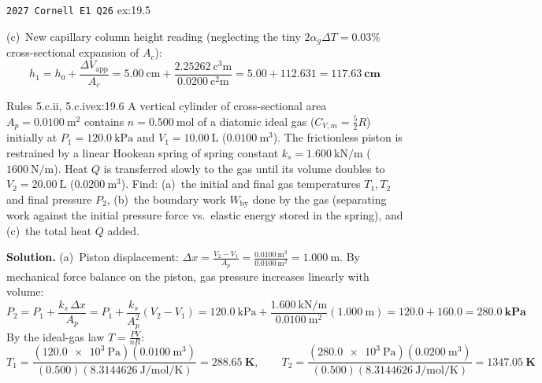 \begin{workedexample}{\texttt{2027 Cornell E1 Q26} }{ex:19.5}
\par\noindent
(c)~New capillary column height reading (neglecting the tiny $2\alpha_g\Delta T = 0.03\%$ cross-sectional expansion of $A_c$):
$$h_1 = h_0 + \frac{\Delta V_{\mathrm{app}}}{A_c} = \SI{5.00}{\centi\meter} + \frac{\SI{2.25262}{\cubic\centi\meter}}{\SI{0.0200}{\square\centi\meter}} = 5.00 + 112.631 = \mathbf{\SI{117.63}{\centi\meter}}$$
\end{workedexample}

\begin{workedexample}{Rules 5.c.ii, 5.c.iv}{ex:19.6}
A vertical cylinder of cross-sectional area $A_p = \SI{0.0100}{\square\meter}$ contains $n = \SI{0.500}{\mole}$ of a diatomic ideal gas ($C_{V,m} = \frac{5}{2}R$) initially at $P_1 = \SI{120.0}{\kilo\pascal}$ and $V_1 = \SI{10.00}{\liter}$ ($\SI{0.0100}{\cubic\meter}$). The frictionless piston is restrained by a linear Hookean spring of spring constant $k_s = \SI{1.600}{\kilo\newton\per\meter}$ ($\SI{1600}{\newton\per\meter}$). Heat $Q$ is transferred slowly to the gas until its volume doubles to $V_2 = \SI{20.00}{\liter}$ ($\SI{0.0200}{\cubic\meter}$). Find: (a)~the initial and final gas temperatures $T_1, T_2$ and final pressure $P_2$, (b)~the boundary work $W_{\mathrm{by}}$ done by the gas (separating work against the initial pressure force vs.\ elastic energy stored in the spring), and (c)~the total heat $Q$ added.
\par\smallskip\noindent
\textbf{Solution.}
(a)~Piston displacement: $\Delta x = \frac{V_2 - V_1}{A_p} = \frac{\SI{0.0100}{\cubic\meter}}{\SI{0.0100}{\square\meter}} = \SI{1.000}{\meter}$. By mechanical force balance on the piston, gas pressure increases linearly with volume:
$$P_2 = P_1 + \frac{k_s\,\Delta x}{A_p} = P_1 + \frac{k_s}{A_p^2}(V_2 - V_1) = \SI{120.0}{\kilo\pascal} + \frac{\SI{1.600}{\kilo\newton\per\meter}}{\SI{0.0100}{\square\meter}}(\SI{1.000}{\meter}) = 120.0 + 160.0 = \mathbf{\SI{280.0}{\kilo\pascal}}$$
By the ideal-gas law $T = \frac{P V}{n R}$:
$$T_1 = \frac{(\SI{120.0e3}{\pascal})(\SI{0.0100}{\cubic\meter})}{(0.500)(\SI{8.3144626}{\joule\per\mole\per\kelvin})} = \mathbf{\SI{288.65}{\kelvin}}, \qquad T_2 = \frac{(\SI{280.0e3}{\pascal})(\SI{0.0200}{\cubic\meter})}{(0.500)(\SI{8.3144626}{\joule\per\mole\per\kelvin})} = \mathbf{\SI{1347.05}{\kelvin}}$$

\end{workedexample}
